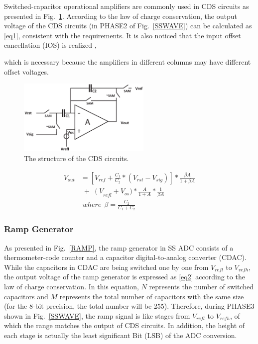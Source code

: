 Switched-capacitor operational amplifiers are commonly used in CDS circuits as presented in Fig.~\ref{CDS}. According to the law of charge conservation, 
the output voltage of the CDS circuits (in PHASE2 of Fig.~\ref{SSWAVE}) can be calculated as \eqref{eq1}, consistent with the requirements. It is also noticed that the input offset cancellation (IOS) is realized \cite{razavi_design_1992}, 

which is necessary because the amplifiers in different columns may have different offset voltages.

\begin{figure}[htbp]
	\centerline{\includegraphics[width=2.5in]{./Figures/CDS.eps}}
	\caption{The structure of the CDS circuits.}
	\label{CDS}
\end{figure} 

\begin{equation}
	\begin{aligned}
		V_{out}&=\left[ V_{ref}+\frac{C_1}{C_2}\ast\left(V_{rst}-V_{sig}\right)\right]\ast\frac{\beta A}{1+\beta A}\\
		&\;{+}\;\left(V\right._{refl}+V_{os})\ast\frac{A}{1+A}\ast\frac{1}{\beta A}\\
		&\;where\ \ \beta=\frac{C_2}{C_1+C_2}
		\label{eq1}
	\end{aligned}
\end{equation}

\subsubsection{Ramp Generator}

As presented in Fig.~\ref{RAMP}, the ramp generator in SS ADC consists of a thermometer-code counter and a capacitor digital-to-analog converter (CDAC). 
While the capacitors in CDAC are being switched one by one from $V_{refl}$ to $V_{vefh}$, the output voltage of the ramp generator is expressed as \eqref{eq2} according to the law of charge conservation. 
In this equation, $N$ represents the number of switched capacitors and $M$ represents the total number of capacitors with the same size (for the 8-bit precision, the total number will be 255). 
Therefore, during PHASE3 shown in Fig.~\ref{SSWAVE}, the ramp signal is like stages from $V_{refl}$ to $V_{refh}$, of which the range matches the output of CDS circuits. 
In addition, the height of each stage is actually the least significant Bit (LSB) of the ADC conversion.

